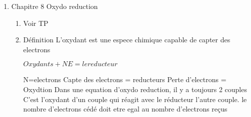 \documentclass[12pt,a4paper]{article}
\begin{document}
\begin{center}
        \shadowbox{\begin{large}
                \textcolor{black}{ }
        \end{large}}
    \end{center}
    \vspace{0.5 cm}

\begin{enumerate}
\item Chapitre 8 Oxydo reduction
\begin{enumerate}
\item
Voir TP\par
\item Définition
L'oxydant est une espece chimique capable de capter des electrons\par
$Oxydants + NE = le reducteur$\par
N=electrons
Capte des electrons = reducteurs
Perte d'electrons = Oxydtion
Dans une equation d'oxydo reduction, il y a toujours 2 couples
C'est l'oxydant d'un couple qui réagit avec le réducteur l'autre couple.
le nombre d'electrons cédé doit etre egal au nombre d'electrons reçus

\end{enumerate}
\end{enumerate}
\end{document}

